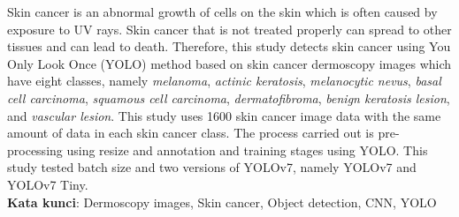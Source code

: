 \documentclass[]{mathuinsa}
\begin{document}
    
    \begin{abstracteng}
        Skin cancer is an abnormal growth of cells on the skin which is often caused by exposure to UV rays. Skin cancer that is not treated properly can spread to other tissues and can lead to death. Therefore, this study detects skin cancer using You Only Look Once (YOLO) method based on skin cancer dermoscopy images which have eight classes, namely \textit{melanoma}, \textit{actinic keratosis}, \textit{melanocytic nevus}, \textit{basal cell carcinoma}, \textit{squamous cell carcinoma}, \textit{dermatofibroma}, \textit{benign keratosis lesion}, and \textit{vascular lesion}. This study uses 1600 skin cancer image data with the same amount of data in each skin cancer class. The process carried out is pre-processing using resize and annotation and training stages using YOLO. This study tested batch size and two versions of YOLOv7, namely YOLOv7 and YOLOv7 Tiny.\\
        \noindent
        \textbf{Kata kunci}: Dermoscopy images, Skin cancer, Object detection, CNN, YOLO
    \end{abstracteng}

    
    
    
    
    


    


    \appendix
    \label{appendix: filter}
\end{document}
